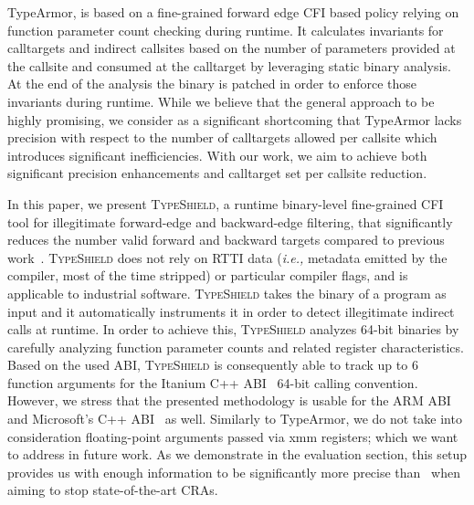 TypeArmor, is based on a fine-grained forward edge CFI based policy relying on function parameter count checking during runtime. It calculates invariants for calltargets and indirect 
callsites based on the number of parameters provided at the callsite and consumed at the calltarget  
by leveraging static binary analysis. At the end of the analysis the binary is patched in order to enforce those invariants during runtime. 
While we believe that the general approach to be highly promising, we consider 
as a significant shortcoming that TypeArmor lacks precision with respect to the number of calltargets allowed per callsite which introduces significant 
inefficiencies. 
With our work, we aim to achieve both significant precision enhancements and calltarget set per callsite reduction.

In this paper, we present \textsc{TypeShield}, a runtime binary-level fine-grained CFI tool for 
illegitimate forward-edge and backward-edge filtering, 
that significantly reduces the number valid forward and backward targets compared to previous work~\cite{veen:typearmor}. 
\textsc{TypeShield} does not rely on RTTI data (\textit{i.e.,} metadata emitted by the compiler, most of the time stripped) or 
particular compiler flags, and is applicable to industrial software.
\textsc{TypeShield} takes the binary of a program as input and it automatically instruments it in order
to detect illegitimate indirect calls at runtime. In order to achieve this, 
\textsc{TypeShield} analyzes 64-bit binaries by carefully analyzing function parameter counts and related register
characteristics. Based on the used ABI, \textsc{TypeShield} is consequently able to track up to 6 function arguments for the 
Itanium C++ ABI~\cite{itanium:abi} 64-bit calling convention.
However, we stress that the presented methodology is usable for the ARM ABI~\cite{arm:abi} and Microsoft's C++ ABI~\cite{microsoft:abi} as well.
Similarly to TypeArmor, we do not take into consideration floating-point arguments passed via xmm registers; which we want to address in future work. 
As we demonstrate in the evaluation section, this setup provides us with enough information to be significantly more precise than~\cite{veen:typearmor} 
when aiming to stop state-of-the-art CRAs.

